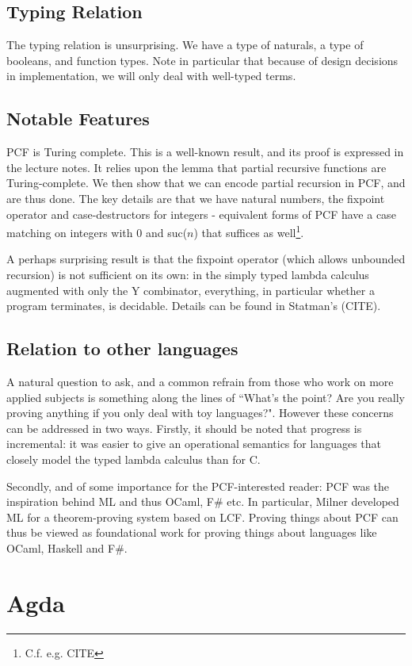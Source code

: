 \documentclass[12pt,a4paper,twoside,openright]{report}
\begin{document}
\subsection{Typing Relation}
The typing relation is unsurprising. We have a type of naturals, a type of booleans, and function types. Note in particular that because of design decisions in implementation, we will only deal with well-typed terms.
\subsection{Notable Features}
PCF is Turing complete. This is a well-known result, and its proof is expressed in the lecture notes. It relies upon the lemma that partial recursive functions are Turing-complete. We then show that we can encode partial recursion in PCF, and are thus done. The key details are that we have natural numbers, the fixpoint operator and case-destructors for integers - equivalent forms of PCF have a case matching on integers with $0$ and suc($n$) that suffices as well\footnote{C.f. e.g. CITE}. 

A perhaps surprising result is that the fixpoint operator (which allows unbounded recursion) is not sufficient on its own: in the simply typed lambda calculus augmented with only the Y combinator, everything, in particular whether a program terminates, is decidable. Details can be found in Statman's (CITE). 
\subsection{Relation to other languages}
A natural question to ask, and a common refrain from those who work on more applied subjects is something along the lines of ``What's the point? Are you really proving anything if you only deal with toy languages?". However these concerns can be addressed in two ways. Firstly, it should be noted that progress is incremental: it was easier to give an operational semantics for languages that closely model the typed lambda calculus than for C. 

Secondly, and of some importance for the PCF-interested reader: PCF was the inspiration behind ML and thus OCaml, F\# etc. In particular, Milner developed ML for a theorem-proving system based on LCF. Proving things about PCF can thus be viewed as foundational work for proving things about languages like OCaml, Haskell and F\#.
\section{Agda}
\end{document}
